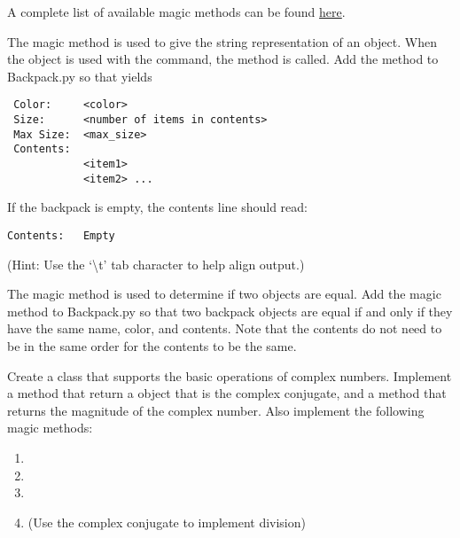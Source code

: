 A complete list of available magic methods can be found \href{https://docs.python.org/2/reference/datamodel.html#special-method-names}{here}.

\begin{problem}

The  magic method is used to give the string representation of an object.
When the object is used with the  command, the  method is called.
Add the  method to Backpack.py so that  yields
\begin{lstlisting}
 Color:		<color>
 Size:		<number of items in contents>
 Max Size:	<max_size>
 Contents:
 			<item1>
 			<item2> ...
\end{lstlisting}

If the backpack is empty, the contents line should read:
\begin{lstlisting}
Contents:	Empty
\end{lstlisting}
(Hint: Use the `\textbackslash{t}' tab character to help align output.)

The  magic method is used to determine if two objects are equal.
Add the  magic method to Backpack.py so that two backpack objects are equal if and only if they have the same name, color, and contents.
Note that the contents do not need to be in the same order for the contents to be the same.
\end{problem}

\begin{problem}
Create a  class that supports the basic operations of complex numbers. Implement a  method that return a  object that is the complex conjugate, and a  method that returns the magnitude of the complex number.
Also implement the following magic methods:
\begin{enumerate}
\item {}
\item {}
\item {}
\item {} (Use the complex conjugate to implement division)
\end{enumerate}
\end{problem}
